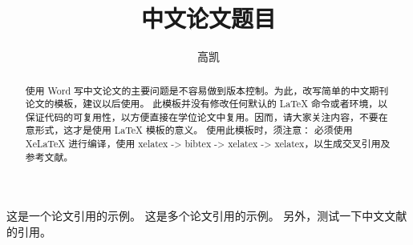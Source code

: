 \documentclass[lang=cn,11pt,a4paper,cite=number, win10]{etpaper}
\title{中文论文题目}
\author{高凯}
\institute{（天津大学电气自动化与信息工程学院，天津~300072）}
\date{\zhtoday}
\begin{document}
\maketitle

\begin{abstract}
使用 Word 写中文论文的主要问题是不容易做到版本控制。为此，改写简单的中文期刊论文的模板，建议以后使用。
此模板并没有修改任何默认的 \LaTeX{} 命令或者环境，以保证代码的可复用性，以方便直接在学位论文中复用。因而，请大家关注内容，不要在意形式，这才是使用 \LaTeX{} 模板的意义。
使用此模板时，须注意：
必须使用 {XeLaTeX} 进行编译，使用 xelatex -> bibtex -> xelatex -> xelatex，以生成交叉引用及参考文献。
\end{abstract}
















这是一个论文引用的示例\cite{Cui2011}。
这是多个论文引用的示例\cite{Yang2002,Beck1997,WANG1999}。
另外，测试一下中文文献的引用\cite{Li2006,Zhang2018}。


\end{document}
